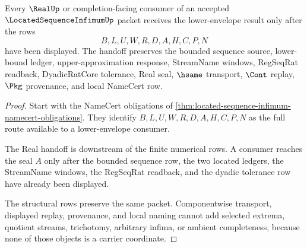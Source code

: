 \begin{theorem}
\label{thm:located-sequence-infimum-real-handoff}
Every $\RealUp$ or completion-facing consumer of an accepted $\LocatedSequenceInfimumUp$ packet receives the lower-envelope result only after the rows
$$
B,L,U,W,R,D,A,H,C,P,N
$$
have been displayed. The handoff preserves the bounded sequence source, lower-bound ledger, upper-approximation response, StreamName windows, RegSeqRat readback, DyadicRatCore tolerance, Real seal, $\hsame$ transport, $\Cont$ replay, $\Pkg$ provenance, and local NameCert row.
\end{theorem}
\begin{proof}
Start with the NameCert obligations of \autoref{thm:located-sequence-infimum-namecert-obligations}. They identify $B,L,U,W,R,D,A,H,C,P,N$ as the full route available to a lower-envelope consumer.

The Real handoff is downstream of the finite numerical rows. A consumer reaches the seal $A$ only after the bounded sequence row, the two located ledgers, the StreamName windows, the RegSeqRat readback, and the dyadic tolerance row have already been displayed.

The structural rows preserve the same packet. Componentwise transport, displayed replay, provenance, and local naming cannot add selected extrema, quotient streams, trichotomy, arbitrary infima, or ambient completeness, because none of those objects is a carrier coordinate.
\end{proof}





